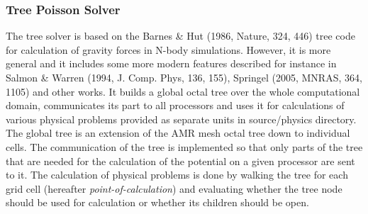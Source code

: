%

\subsubsection{Tree Poisson Solver}
\label{Sec:GridSolversBHTree}

The tree solver is based on the Barnes \& Hut (1986, Nature, 324, 446) tree code
for calculation of gravity forces in N-body simulations. However, it is more
general and it includes some more modern features described for instance in
Salmon \& Warren (1994, J. Comp. Phys, 136, 155), Springel (2005, MNRAS, 364,
1105) and other works. It builds a global octal tree over the whole
computational domain, communicates its part to all processors and uses it for
calculations of various physical problems provided as separate units in
source/physics directory. The global tree is an extension of the AMR mesh octal
tree down to individual cells. The communication of the tree is implemented so
that only parts of the tree that are needed for the calculation of the potential
on a given processor are sent to it. The calculation of physical problems is
done by walking the tree for each grid cell (hereafter {\em
point-of-calculation}) and evaluating whether the tree node should be used for
calculation or whether its children should be open.

